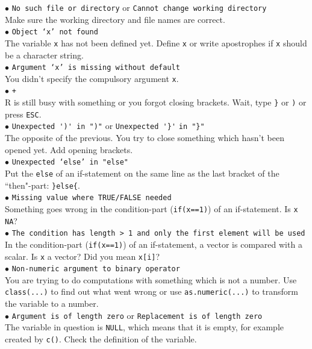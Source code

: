 \documentclass[a4paper,11pt,twocolumn,tablecaptionabove]{scrartcl} %
\begin{document}
\noindent $\bullet$ \texttt{No such file or directory} or \texttt{Cannot change working directory} \\
Make sure the working directory and file names are correct.\\
\noindent $\bullet$ \texttt{Object `x' not found}\\
The variable \texttt{x} has not been defined yet. Define \texttt{x} or write apostrophes if \texttt{x} should be a character string.\\
\noindent $\bullet$ \texttt{Argument `x' is missing without default}\\
You didn't specify the compulsory argument \texttt{x}.\\
\noindent $\bullet$ \texttt{+}\\ %
R is still busy with something or you forgot closing brackets. Wait, type \verb!}! or \verb!)! or press \texttt{ESC}.\\ %
\noindent $\bullet$ \verb!Unexpected ')' in ")"! or \verb!Unexpected '}'! \verb!in "}"!\\ 
The opposite of the previous. You try to close something which hasn't been opened yet. Add opening brackets.\\
\noindent $\bullet$ \texttt{Unexpected `else' in "else"}\\
Put the \verb!else! of an if-statement on the same line as the last bracket of the ``then"-part: \verb!}else{!.\\
\noindent $\bullet$ \texttt{Missing value where TRUE/FALSE needed}\\
Something goes wrong in the condition-part (\texttt{if(x==1)}) of an if-statement. Is \texttt{x} \texttt{NA}? \\
\noindent $\bullet$ \texttt{The condition has length > 1 and only the first element will be used}\\
In the condition-part (\texttt{if(x==1)}) of an if-statement, a vector is compared with a scalar. Is \texttt{x} a vector? Did you mean \texttt{x[i]}?\\
\noindent $\bullet$ \texttt{Non-numeric argument to binary operator} \\
You are trying to do computations with something which is not a number. Use \texttt{class(...)} to find out what went wrong or use \texttt{as.numeric(...)} to transform the variable to a number.\\
\noindent $\bullet$ \texttt{Argument is of length zero} or \texttt{Replacement is of length zero}\\
The variable in question is \texttt{NULL}, which means that it is empty, for example created by \texttt{c()}. Check the definition of the variable.
\end{document}
